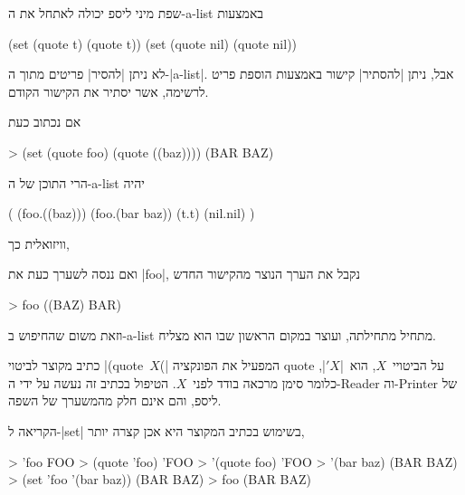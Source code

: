 שפת מיני ליספ יכולה לאתחל את ה-a-list באמצעות
\begin{LIBRARY}
(set (quote t) (quote t))
(set (quote nil) (quote nil))
\end{LIBRARY}
לא ניתן \ע|להסיר| פריטים מתוך ה-\E|a-list|. אבל, ניתן \ע|להסתיר| קישור באמצעות
הוספת פריט לרשימה, אשר יסתיר את הקישור הקודם.

אם נכתוב כעת
\begin{LISP}
> (set (quote foo) (quote ((baz))))
(BAR BAZ)
\end{LISP}
הרי התוכן של ה-a-list יהיה
\begin{LISP}
(
  (foo.((baz)))
  (foo.(bar baz))
  (t.t)
  (nil.nil)
)
\end{LISP}
וויזואלית כך,
\begin{LTR}
\end{LTR}

ואם ננסה לשערך כעת את \T|foo|, נקבל את הערך הנוצר מהקישור החדש
\begin{LISP}
> foo
((BAZ) BAR)
\end{LISP}
וזאת משום שהחיפוש ב-a-list מתחיל מתחילתה, ועוצר במקום הראשון שבו הוא מצליח.

כתיב מקוצר לביטוי \E|(quote~$X$(| המפעיל את הפונקציה quote על הביטויי~$X$,
הוא~\E|$'X$|, כלומר סימן מרכאה בודד לפני~$X$. הטיפול בכתיב זה נעשה על ידי
ה-Reader וה-Printer של ליספ, והם אינם חלק מהמשערך של השפה.

הקריאה ל-\E|set| בשימוש בכתיב המקוצר היא אכן קצרה יותר,
\begin{LISP}
> 'foo
FOO
> (quote 'foo)
'FOO
> '(quote foo)
'FOO
> '(bar baz)
(BAR BAZ)
> (set 'foo '(bar baz))
(BAR BAZ)
> foo
(BAR BAZ)
\end{LISP}

